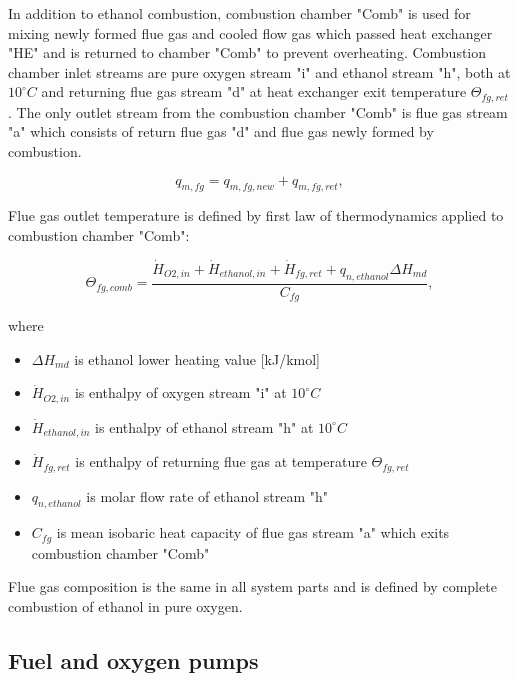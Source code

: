 \documentclass{article}
\begin{document}
	In addition to ethanol combustion, combustion chamber "Comb" is used for mixing newly formed flue gas and cooled flow gas which passed heat exchanger "HE" and is returned to chamber "Comb" to prevent overheating. Combustion chamber inlet streams are pure oxygen stream "i" and ethanol stream "h", both at $10^{\circ}C$ and returning flue gas stream "d" at heat exchanger exit temperature  $\Theta_{fg,ret}$. The only outlet stream from the combustion chamber "Comb" is flue gas stream "a" which consists of return flue gas "d" and flue gas newly formed by combustion. 
	
	\begin{equation}\label{eq:flue_gas_stream_new}
		q_{m,fg} = q_{m,fg,new} + q_{m,fg,ret},
	\end{equation}
	
	\noindent
	Flue gas outlet temperature is defined by first law of thermodynamics applied to combustion chamber "Comb":
	
	\begin{equation}\label{eq:flue_gas_out_temp}
		\Theta_{fg,comb} = \frac{\dot{H}_{O2,in} + \dot{H}_{ethanol,in} +\dot{H}_{fg,ret} + q_{n,ethanol} \Delta H_{md}}{C_{fg}},
	\end{equation}
	
	\noindent
	where
	
	\begin{itemize}
		\item $\Delta H_{md}$ is ethanol lower heating value [kJ/kmol]
		\item $\dot{H}_{O2,in}$ is enthalpy of oxygen stream "i" at $10^\circ C$
		\item $\dot{H}_{ethanol,in}$ is enthalpy of ethanol stream "h" at $10^\circ C$
		\item $\dot{H}_{fg,ret}$ is enthalpy of returning flue gas at temperature $\Theta_{fg,ret}$
		\item $q_{n,ethanol}$ is molar flow rate of ethanol stream "h"
		\item $C_{fg}$ is mean isobaric heat capacity of flue gas stream "a" which exits combustion chamber "Comb"
	\end{itemize}

	\noindent
	Flue gas composition is the same in all system parts and is defined by complete combustion of ethanol in pure oxygen.
	
	\subsection{Fuel and oxygen pumps}
	
\end{document}
